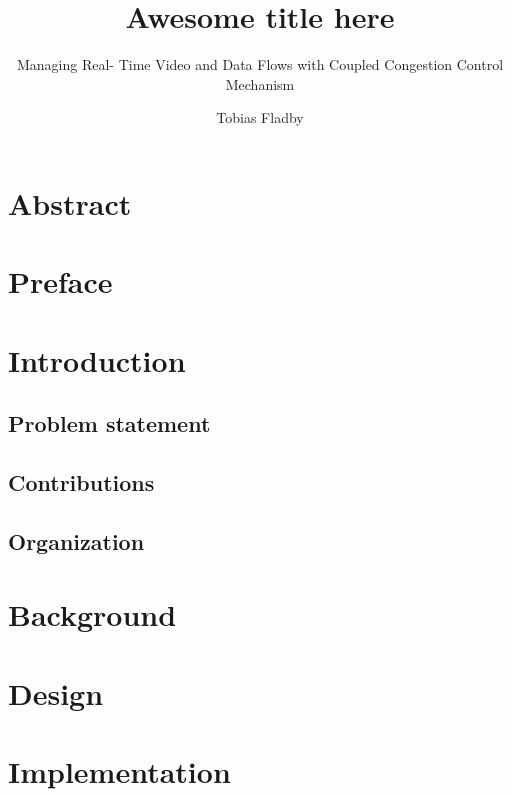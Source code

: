 \documentclass[UKenglish]{ifimaster}
\title{Awesome title here}
\subtitle{Managing Real- Time Video and Data Flows with Coupled Congestion Control Mechanism}
\author{Tobias Fladby}
\begin{document}
\duoforside[dept={Department of Informatics},   %
  program={programming and system architecture},  %
  long]                                       

\frontmatter{}
\chapter*{Abstract}            

\tableofcontents{}
\listoffigures{}
\listoftables{}

\chapter*{Preface}              

\mainmatter{}
\chapter{Introduction}              

\section{Problem statement}
\section{Contributions}

\section{Organization}

\chapter{Background}







\chapter{Design}


\chapter{Implementation}                 

\end{document}
